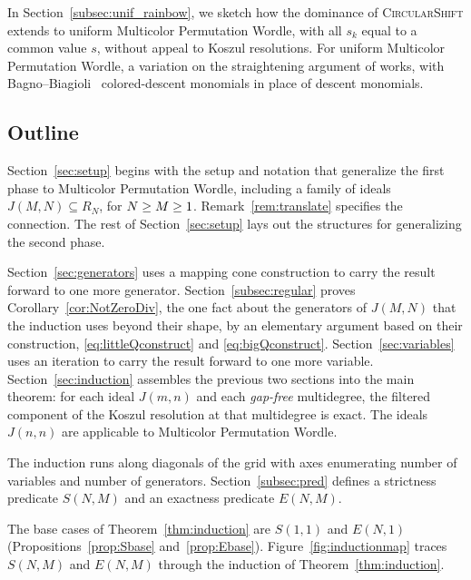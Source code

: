 \documentclass[12pt]{amsart}
\theoremstyle{definition}
\theoremstyle{remark}
\newcommand\rainbow{Multicolor Permutation Wordle\xspace}
\newcommand\basicstrat{\mbox{\textnormal{\textsc{CircularShift}}}\xspace}
\newcommand\KSV{monthly-kutin-smithline-vatter}
\begin{document}
In Section~\ref{subsec:unif_rainbow}, we sketch how the dominance of \basicstrat
extends to uniform \rainbow, with all $s_k$ equal to a common value $s$,
without appeal to Koszul resolutions.
For uniform \rainbow, a variation on the straightening argument
of \cite{\KSV} works, 
with Bagno--Biagioli~\cite{bagno2007colored} 
colored-descent monomials in place of descent monomials.
    
\subsection{Outline}
    
    Section~\ref{sec:setup} begins with the
    setup and notation that generalize the
    first phase to \rainbow, including
    a family of ideals $J(M, N) \subseteq R_N$, for $N\geq\nobreak M \geq\nobreak 1$.
    Remark~\ref{rem:translate} specifies
    the connection.
    The rest of Section~\ref{sec:setup} lays out the
    structures for generalizing the
    second phase.
            
    Section~\ref{sec:generators} uses a mapping cone construction 
    to carry the result forward to one more generator.
    Section~\ref{subsec:regular} proves Corollary~\ref{cor:NotZeroDiv}, the one fact
    about the generators of $J(M, N)$ that the induction uses beyond their shape, 
    by an elementary argument based on their construction, 
    \eqref{eq:littleQconstruct} and \eqref{eq:bigQconstruct}.
     Section~\ref{sec:variables} uses an iteration to carry the result 
     forward to one more variable.
      Section~\ref{sec:induction} assembles the previous two sections
     into the main theorem: for each ideal $J(m, n)$
    and each \emph{gap-free} multidegree,
    the filtered component of the Koszul resolution at that multidegree is exact.
    The ideals $J(n, n)$ are applicable to \rainbow.
    
    The induction runs along diagonals of the grid with axes enumerating number of
variables and number of generators.  Section~\ref{subsec:pred} defines
a strictness predicate $S(N, M)$ and an exactness predicate $E(N, M)$.

The base cases of Theorem~\ref{thm:induction} are $S(1, 1)$ and $E(N,1)$
(Propositions~\ref{prop:Sbase} and~\ref{prop:Ebase}).
Figure~\ref{fig:inductionmap} traces $S(N, M)$ and $E(N, M)$
through the induction of Theorem~\ref{thm:induction}.
\end{document}
